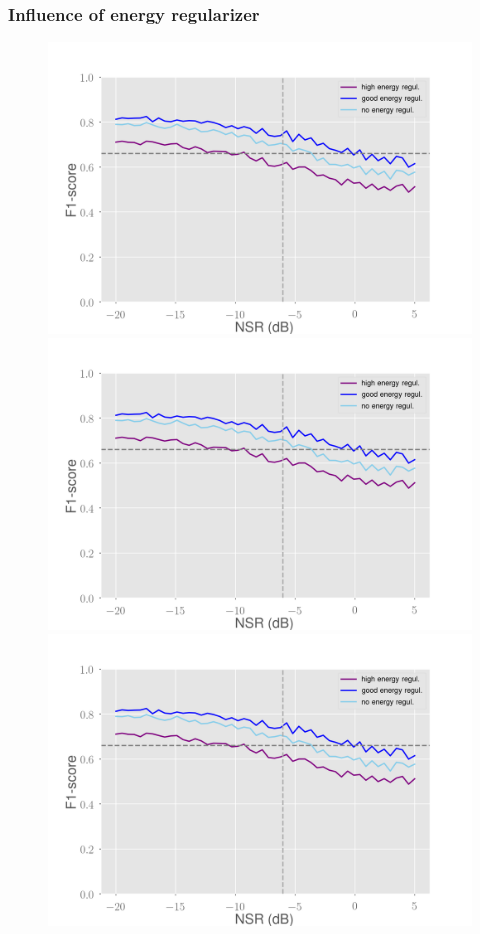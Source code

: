 \documentclass[10pt]{beamer}
\begin{document}
\begin{frame}
\frametitle{Influence of energy regularizer}
\begin{multicols}{2}
\begin{figure}
\centering
\begin{overprint}
    \includegraphics[scale=0.2]{figs/energy-ip-noisy}
    \includegraphics[scale=0.2]{figs/energy-ip-noisy}
    \includegraphics[scale=0.2]{figs/energy-ip-noisy}

\end{overprint}
\end{figure}
\end{multicols}
\end{frame}
\end{document}
